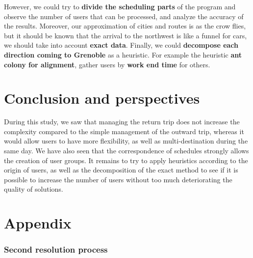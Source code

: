 \documentclass[12pt, a4paper, twoside]{memoir}
\newcommand{\newpar}{\vskip 0.2in \noindent}
\begin{document}
{	However, we could try to \textbf{divide the scheduling parts} of the program and observe the number of users that can be processed, and analyze the accuracy of the results. Moreover, our approximation of cities and routes is as the crow flies, but it should be known that the arrival to the northwest is like a funnel for cars, we should take into account \textbf{exact data}. Finally, we could \textbf{decompose each direction coming to Grenoble} as a heuristic. For example the heuristic\textbf{ ant colony for alignment}, gather users by \textbf{work end time} for others.
	
	\cleardoublepage
	\chapter*{Conclusion and perspectives}
	
	During this study, we saw that managing the return trip does not increase the complexity compared to the simple management of the outward trip, whereas it would allow users to have more flexibility, as well as multi-destination during the same day. We have also seen that the correspondence of schedules strongly allows the creation of user groups. 	
	\newpar
	It remains to try to apply heuristics according to the origin of users, as well as the decomposition of the exact method to see if it is possible to increase the number of users without too much deteriorating the quality of solutions.

	
	\backmatter
	\cleardoublepage
	
	
	
	
	\cleardoublepage
	\appendix
	\chapter*{Appendix}
	
	\subsection{Second resolution process}
	
}
\end{document}

